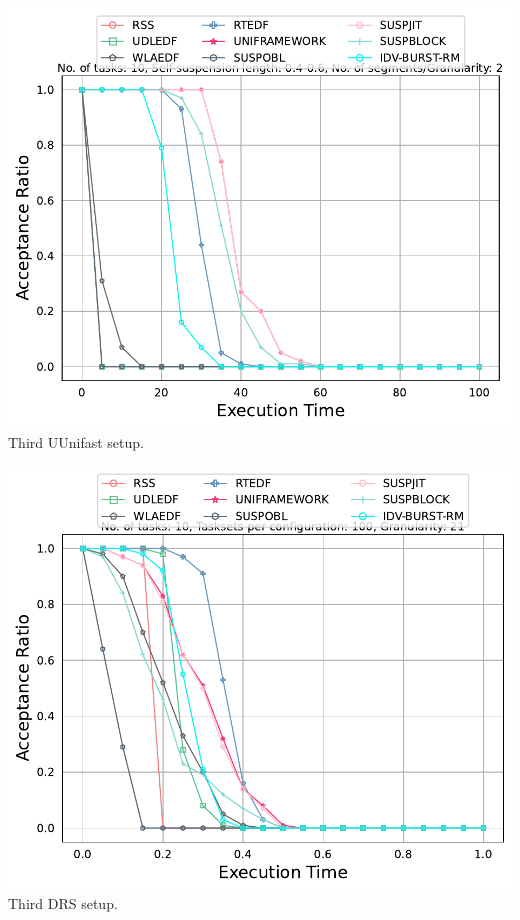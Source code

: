 \documentclass[]{article}
\begin{document}
        \clearpage
        
	\begin{minipage}[t]{0.48\linewidth}
		\centering
			
		\includegraphics[width=\linewidth]{comparison_3rdSetups_uni.pdf}
		Third UUnifast setup.
		\vspace{0.3cm}
		
		
	\end{minipage}\hfill
	\begin{minipage}[t]{0.48\linewidth}
		\centering
		
                   
		\includegraphics[width=\linewidth]{comaprison_3rdSetup_DRS.pdf}
		Third DRS setup.
		\vspace{0.3cm}
	\end{minipage}
\end{document}
